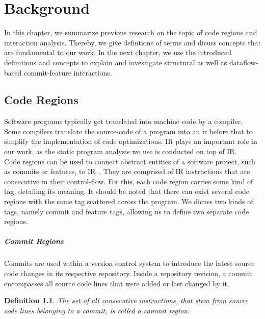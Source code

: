 \chapter{Background}\label{ch:background}

In this chapter, we summarize previous research on the topic of code regions and interaction analysis.
Thereby, we give defintions of terms and dicuss concepts that are fundamental to our work.
In the next chapter, we use the introduced definitions and concepts to explain and investigate structural as well as dataflow-based commit-feature interactions.

\section{Code Regions}\label{ch:code_regions}
Software programs typically get translated into machine code by a compiler.
Some compilers translate the source-code of a program into an \ac{ir} before that to simplify the implementation of code optimizations.
IR plays an important role in our work, as the static program analysis we use is conducted on top of IR. \\
Code regions can be used to connect abstract entities of a software project, such as commits or features, to IR~\cite{sattler2023seal}.
They are comprised of IR instructions that are consecutive in their control-flow.
For this, each code region carries some kind of tag, detailing its meaning.
It should be noted that there can exist several code regions with the same tag scattered across the program.
We dicuss two kinds of tags, namely commit and feature tags, allowing us to define two separate code regions. 

\paragraph{Commit Regions}\label{sec:commit_regions}

Commits are used within a version control system to introduce the latest source code changes in its respective repository.
Inside a repository revision, a commit encompasses all source code lines that were added or last changed by it. 

\newtheorem{definition}{Definition}
\newcommand{\definitionautorefname}{Definition}
\begin{definition}\label{def:commit_regions}
	\emph{The set of all consecutive instructions, that stem from source code lines belonging to a commit, is called a} commit region.
\end{definition}

